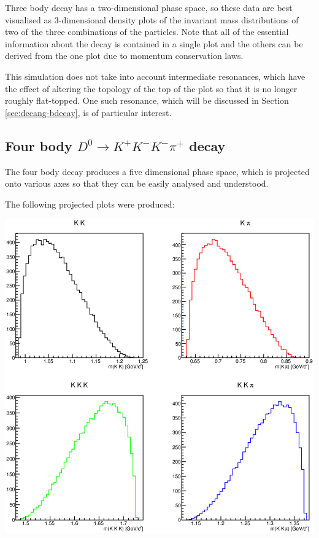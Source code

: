 Three body decay has a two-dimensional phase space, so these data are best
visualised as 3-dimensional density plots of the invariant mass distributions of
two of the three combinations of the particles. Note that all of the essential
information about the decay is contained in a single plot and the others can be
derived from the one plot due to momentum conservation laws.

This simulation does not take into account intermediate resonances, which have
the effect of altering the topology of the top of the plot so that it is no
longer roughly flat-topped. One such resonance, which will be discussed in
Section \ref{sec:decang-bdecay}, is of particular interest.

\subsection{Four body $D^0 \rightarrow K^+ K^- K^- \pi^+$ decay}
\label{sec:invmass/FourBodyDecay}

The four body decay produces a five dimensional phase space, which is projected
onto various axes so that they can be easily analysed and understood.

The following projected plots were produced:

\begin{center}
    \includegraphics[width=\linewidth]{graphs/FourBodyDecay}
    \label{fig:FourBodyDecay}
\end{center}

